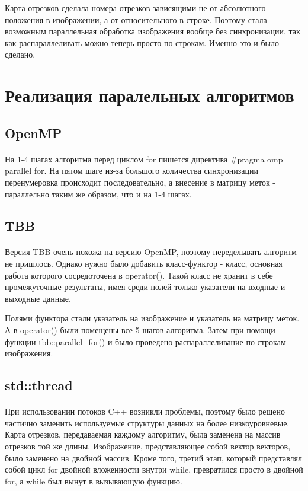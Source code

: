 \documentclass[14pt]{extarticle}
\begin{document}
\par Карта отрезков сделала номера отрезков зависящими не от абсолютного положения в изображении, а от относительного в строке. Поэтому стала возможным параллельная обработка изображения вообще без синхронизации, так как распараллеливать можно теперь просто по строкам. Именно это и было сделано.
\newpage
\section{Реализация паралельных алгоритмов}
\subsection{OpenMP}
\paragraph{} На 1-4 шагах алгоритма перед циклом for пишется директива \#pragma omp parallel for. На пятом шаге из-за большого количества синхронизации перенумеровка происходит последовательно, а внесение в матрицу меток - параллельно таким же образом, что и на 1-4 шагах.
\subsection{TBB}
\paragraph{} Версия TBB очень похожа на версию OpenMP, поэтому переделывать алгоритм не пришлось. Однако нужно было добавить класс-функтор - класс, основная работа которого сосредоточена в operator(). Такой класс не хранит в себе промежуточные результаты, имея среди полей только указатели на входные и выходные данные.
\par Полями функтора стали указатель на изображение и указатель на матрицу меток. А в operator() были помещены все 5 шагов алгоритма. Затем при помощи функции tbb::parallel\_for() и было проведено распараллеливание по строкам изображения.
\subsection{std::thread}
\paragraph{}  При использовании потоков C++ возникли проблемы, поэтому было решено частично заменить используемые структуры данных на более низкоуровневые. Карта отрезков, передаваемая каждому алгоритму, была заменена на массив отрезков той же длины. Изображение, представляющее собой вектор векторов, было заменено на двойной массив. Кроме того, третий этап, который представлял собой цикл for двойной вложенности внутри while, превратился просто в двойной for, а while был вынут в вызывающую функцию.
\newpage
\end{document}
